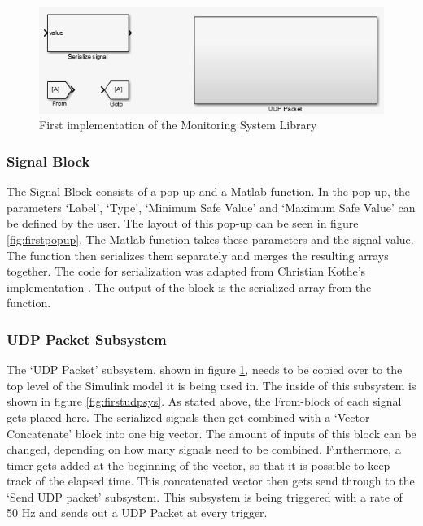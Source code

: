 \begin{figure}[H]
	\centering
	\includegraphics[width=.75\textwidth]{implementation/library}
	\caption{First implementation of the Monitoring System Library} 
	\label{fig:firstmonsys}
\end{figure}

\subsubsection{Signal Block}
The Signal Block consists of a pop-up and a Matlab function. In the pop-up, the parameters `Label', `Type', `Minimum Safe Value' and `Maximum Safe Value' can be defined by the user. The layout of this pop-up can be seen in figure \ref{fig:firstpopup}. The Matlab function takes these parameters and the signal value. The function then serializes them separately and merges the resulting arrays together. The code for serialization was adapted from Christian Kothe's implementation \cite{web:serialize}. The output of the block is the serialized array from the function.

\subsubsection{UDP Packet Subsystem}
The `UDP Packet' subsystem, shown in figure \ref{fig:firstmonsys}, needs to be copied over to the top level of the Simulink model it is being used in. The inside of this subsystem is shown in figure \ref{fig:firstudpsys}. As stated above, the From-block of each signal gets placed here. The serialized signals then get combined with a `Vector Concatenate' block into one big vector. The amount of inputs of this block can be changed, depending on how many signals need to be combined. Furthermore, a timer gets added at the beginning of the vector, so that it is possible to keep track of the elapsed time. This concatenated vector then gets send through to the `Send UDP packet' subsystem. This subsystem is being triggered with a rate of 50 Hz and sends out a UDP Packet at every trigger.

